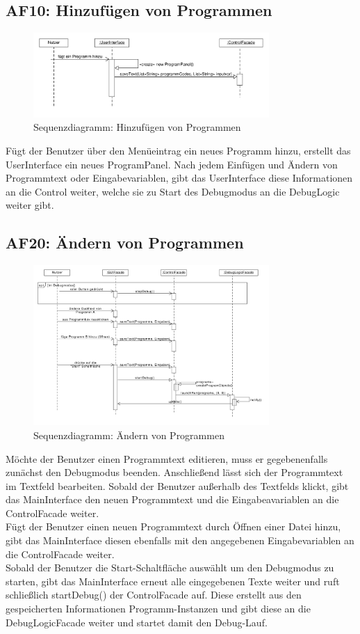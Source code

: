 \documentclass[parskip=full]{scrartcl}
\begin{document}
\newpage
\subsection{AF10: Hinzufügen von Programmen}
\begin{figure}[!h]
\centering
\includegraphics[width=0.8\textwidth]{diagrammIdeenUmlet/SequenceDiagrams/seq_AF10PDF.pdf}
\caption{Sequenzdiagramm: Hinzufügen von Programmen}
\end{figure}
Fügt der Benutzer über den Menüeintrag ein neues Programm hinzu, erstellt das UserInterface ein
neues ProgramPanel. Nach jedem Einfügen und Ändern von Programmtext oder Eingabevariablen, gibt
das UserInterface diese Informationen an die Control weiter, welche sie zu Start des Debugmodus
an die DebugLogic weiter gibt.

\newpage
\subsection{AF20: Ändern von Programmen}
\begin{figure}[!h]
\centering
\includegraphics[width=0.8\textwidth]{diagrammIdeenUmlet/SequenceDiagrams/seq_AF20PDF.pdf}
\caption{Sequenzdiagramm: Ändern von Programmen}
\end{figure}
Möchte der Benutzer einen Programmtext editieren, muss er gegebenenfalls zunächst den Debugmodus beenden.
Anschließend lässt sich der Programmtext im Textfeld bearbeiten. Sobald der Benutzer außerhalb des
Textfelds klickt, gibt das MainInterface den neuen Programmtext und die Eingabeavariablen an die ControlFacade weiter. \\
Fügt der Benutzer einen neuen Programmtext durch Öffnen einer Datei hinzu, gibt das MainInterface diesen ebenfalls
mit den angegebenen Eingabevariablen an die ControlFacade weiter.\\
Sobald der Benutzer die Start-Schaltfläche auswählt um den Debugmodus zu starten, gibt das MainInterface erneut
alle eingegebenen Texte weiter und ruft schließlich startDebug() der ControlFacade auf. Diese erstellt aus den gespeicherten Informationen
Programm-Instanzen und gibt diese an die DebugLogicFacade weiter und startet damit den Debug-Lauf.
\end{document}
